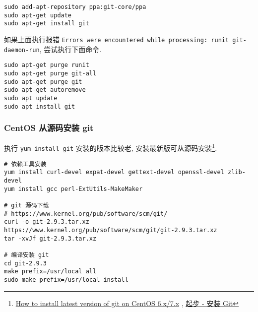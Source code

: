 \begin{lstlisting}
sudo add-apt-repository ppa:git-core/ppa
sudo apt-get update
sudo apt-get install git
\end{lstlisting}

如果上面执行报错
\lstinline!Errors were encountered while processing: runit git-daemon-run!,
尝试执行下面命令.

\begin{lstlisting}
sudo apt-get purge runit
sudo apt-get purge git-all
sudo apt-get purge git
sudo apt-get autoremove
sudo apt update
sudo apt install git
\end{lstlisting}

\subsubsection{CentOS 从源码安装
git}\label{centos-ux4eceux6e90ux7801ux5b89ux88c5-git}

执行 \lstinline!yum install git! 安装的版本比较老,
安装最新版可从源码安装\footnote{\href{http://stackoverflow.com/questions/21820715/how-to-install-latest-version-of-git-on-centos-6-x-7-x}{How
  to install latest version of git on CentOS 6.x/7.x} ,
  \href{https://git-scm.com/book/zh/v1/\%E8\%B5\%B7\%E6\%AD\%A5-\%E5\%AE\%89\%E8\%A3\%85-Git}{起步
  - 安装 Git}}.

\begin{lstlisting}
# 依赖工具安装
yum install curl-devel expat-devel gettext-devel openssl-devel zlib-devel
yum install gcc perl-ExtUtils-MakeMaker

# git 源码下载
# https://www.kernel.org/pub/software/scm/git/
curl -o git-2.9.3.tar.xz https://www.kernel.org/pub/software/scm/git/git-2.9.3.tar.xz
tar -xvJf git-2.9.3.tar.xz

# 编译安装 git
cd git-2.9.3
make prefix=/usr/local all
sudo make prefix=/usr/local install
\end{lstlisting}

